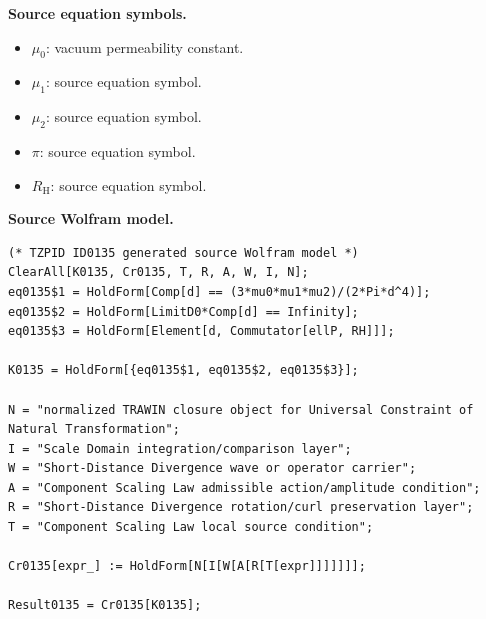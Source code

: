\begin{minipage}[t]{0.49\linewidth}
\begingroup
\small
\raggedright
\textbf{Source equation symbols.}\par
\begin{itemize}[leftmargin=1.35em,itemsep=1pt,topsep=1pt,parsep=0pt]
    \item $\mu_0$: vacuum permeability constant.
    \item $\mu_1$: source equation symbol.
    \item $\mu_2$: source equation symbol.
    \item $\pi$: source equation symbol.
    \item $R_{\mathrm{H}}$: source equation symbol.
\end{itemize}
\endgroup
\end{minipage}\hfill
\begin{minipage}[t]{0.47\linewidth}
\begingroup
\scriptsize
\raggedright
\textbf{Source Wolfram model.}\par
\begin{Verbatim}[fontsize=\tiny,breaklines=true,breakanywhere=true]
(* TZPID ID0135 generated source Wolfram model *)
ClearAll[K0135, Cr0135, T, R, A, W, I, N];
eq0135$1 = HoldForm[Comp[d] == (3*mu0*mu1*mu2)/(2*Pi*d^4)];
eq0135$2 = HoldForm[LimitD0*Comp[d] == Infinity];
eq0135$3 = HoldForm[Element[d, Commutator[ellP, RH]]];

K0135 = HoldForm[{eq0135$1, eq0135$2, eq0135$3}];

N = "normalized TRAWIN closure object for Universal Constraint of Natural Transformation";
I = "Scale Domain integration/comparison layer";
W = "Short-Distance Divergence wave or operator carrier";
A = "Component Scaling Law admissible action/amplitude condition";
R = "Short-Distance Divergence rotation/curl preservation layer";
T = "Component Scaling Law local source condition";

Cr0135[expr_] := HoldForm[N[I[W[A[R[T[expr]]]]]]];

Result0135 = Cr0135[K0135];
\end{Verbatim}
\endgroup
\end{minipage}

